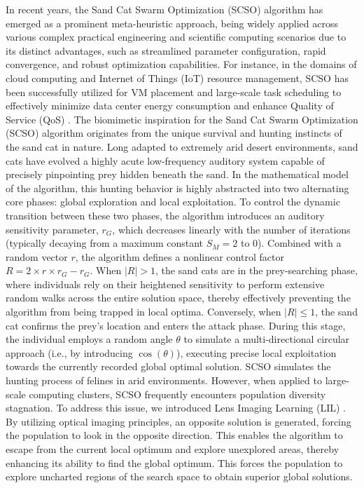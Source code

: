 \documentclass[conference]{{IEEEtran}}
\begin{document}
In recent years, the Sand Cat Swarm Optimization (SCSO) algorithm has emerged as a prominent meta-heuristic approach, being widely applied across various complex practical engineering and scientific computing scenarios due to its distinct advantages, such as streamlined parameter configuration, rapid convergence, and robust optimization capabilities. For instance, in the domains of cloud computing and Internet of Things (IoT) resource management, SCSO has been successfully utilized for VM placement and large-scale task scheduling to effectively minimize data center energy consumption and enhance Quality of Service (QoS) \cite{li2025workspace}. The biomimetic inspiration for the Sand Cat Swarm Optimization (SCSO) algorithm originates from the unique survival and hunting instincts of the sand cat in nature. Long adapted to extremely arid desert environments, sand cats have evolved a highly acute low-frequency auditory system capable of precisely pinpointing prey hidden beneath the sand. In the mathematical model of the algorithm, this hunting behavior is highly abstracted into two alternating core phases: global exploration and local exploitation.
To control the dynamic transition between these two phases, the algorithm introduces an auditory sensitivity parameter, $r_G$, which decreases linearly with the number of iterations (typically decaying from a maximum constant $S_M = 2$ to $0$). Combined with a random vector $r$, the algorithm defines a nonlinear control factor $R = 2 \times r \times r_G - r_G$. When $|R| > 1$, the sand cats are in the prey-searching phase, where individuals rely on their heightened sensitivity to perform extensive random walks across the entire solution space, thereby effectively preventing the algorithm from being trapped in local optima. Conversely, when $|R| \le 1$, the sand cat confirms the prey's location and enters the attack phase. During this stage, the individual employs a random angle $\theta$ to simulate a multi-directional circular approach (i.e., by introducing $\cos(\theta)$), executing precise local exploitation towards the currently recorded global optimal solution. SCSO simulates the hunting process of felines in arid environments. However, when applied to large-scale computing clusters, SCSO frequently encounters population diversity stagnation. To address this issue, we introduced Lens Imaging Learning (LIL) \cite{lu2021lil}. By utilizing optical imaging principles, an opposite solution is generated, forcing the population to look in the opposite direction. This enables the algorithm to escape from the current local optimum and explore unexplored areas, thereby enhancing its ability to find the global optimum. This forces the population to explore uncharted regions of the search space to obtain superior global solutions.
\end{document}
